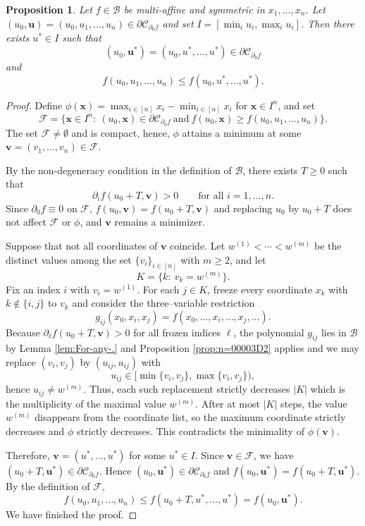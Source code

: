 \documentclass[10pt,a4paper]{amsart}
\providecommand{\propositionname}{Proposition}
\numberwithin{equation}{section}
\numberwithin{figure}{section}
\theoremstyle{plain}
\theoremstyle{remark}
\theoremstyle{definition}
\theoremstyle{plain}
\theoremstyle{definition}
\theoremstyle{plain}
\theoremstyle{plain}
\newtheorem{prop}[thm]{\protect\propositionname}
\theoremstyle{plain}
\newcommand{\pdv}{\partial}
\def\C{\mathcal C}
\def\x{\mathbf{x}}
\def\u{\mathbf{u}}
\def\v{\mathbf{v}}
\providecommand{\propositionname}{Proposition}
\providecommand{\propositionname}{Proposition}
\begin{document}
\begin{prop}
\label{prop:symmetry}Let $f\in\mathcal{B}$ be multi-affine and symmetric
in $x_{1},\dots,x_{n}$. Let $(u_{0},\u)=(u_{0},u_{1},\dots,u_{n})\in\partial\mathcal{C}_{\partial_{0}f}$
and set $I=[\min_{i}u_{i},\max_{i}u_{i}]$. Then there exists $u^{*}\in I$
such that 
\[
(u_{0},\u^{*})=(u_{0},u^{*},\dots,u^{*})\in\partial\mathcal{C}_{\partial_{0}f}
\]
and 
\[
f(u_{0},u_{1},\dots,u_{n})\le f(u_{0},u^{*},\dots,u^{*}).
\]
\end{prop}

\begin{proof}
Define $\phi(\x)=\max_{i\in[n]}x_{i}-\min_{i\in[n]}x_{i}$ for $\x\in I^{n}$,
and set 
\[
\mathcal{F}=\bigl\{\x\in I^{n}:\ (u_{0},\x)\in\partial\mathcal{C}_{\partial_{0}f}\ \text{and}\ f(u_{0},\x)\ge f(u_{0},u_{1},\dots,u_{n})\bigr\}.
\]
The set $\mathcal{F}\not=\emptyset$ and is compact, hence, $\phi$ attains
a minimum at some $\mathbf{v}=(v_{1},\dots,v_{n})\in\mathcal{F}$.

By the non-degeneracy condition in the definition of $\mathcal{B}$,
there exists $T\ge0$ such that 
\[
\partial_{i}f(u_{0}+T,\mathbf{v})>0\qquad\text{for all }i=1,\dots,n.
\]
Since $\partial_{0}f\equiv0$ on $\mathcal{F}$, $f(u_{0},\v)=f(u_{0}+T,\v)$
and replacing $u_{0}$ by $u_{0}+T$ does not affect $\mathcal{F}$
or $\phi$, and $\mathbf{v}$ remains a minimizer. 

Suppose that not all coordinates of $\v$ coincide. Let $w^{(1)}<\cdots<w^{(m)}$
be the distinct values among the set $\{v_{i}\}_{i\in[n]}$ with $m\ge2$,
and let 
\[
K=\{k:\ v_{k}=w^{(m)}\}.
\]
Fix an index $i$ with $v_{i}=w^{(1)}$. For each $j\in K$, freeze
every coordinate $x_{k}$ with $k\notin\{i,j\}$ to $v_{k}$ and consider
the three--variable restriction 
\[
g_{ij}(x_0,x_{i},x_{j})=f(x_0,\dots,x_{i},\dots,x_{j},\dots).
\]
Because $\partial_{\ell}f(u_{0}+T,\mathbf{v})>0$ for all frozen indices
$\ell$, the polynomial $g_{ij}$ lies in $\mathcal{B}$ by Lemma \ref{lem:For-any-.} and Proposition
\ref{prop:n=00003D2} applies and we may replace $(v_{i},v_{j})$
by $(u_{ij},u_{ij})$ with 
\[
u_{ij}\in[\min\{v_{i},v_{j}\},\max\{v_{i},v_{j}\}),
\]
hence $u_{ij}\neq w^{(m)}$. Thus, each such replacement strictly decreases
$|K|$ which is the multiplicity of the maximal value $w^{(m)}$.
After at most $|K|$ steps, the value $w^{(m)}$ disappears from the
coordinate list, so the maximum coordinate strictly decreases and
$\phi$ strictly decreases. This contradicts the minimality of $\phi(\mathbf{v})$.

Therefore, $\v=(u^{*},\dots,u^{*})$ for some $u^{*}\in I$. Since
$\v\in\mathcal{F}$, we have $(u_{0}+T,\u^{*})\in\partial\mathcal{C}_{\partial_{0}f}$.
Hence $(u_{0},\u^{*})\in\pdv\C_{\pdv_{0}f}$ and $f(u_{0},\u^{*})=f(u_{0}+T,\u^{*})$.
By the definition of $\mathcal{F}$, 
\[
f(u_{0},u_{1},\dots,u_{n})\le f(u_{0}+T,u^{*},\dots,u^{*})=f(u_{0},\u^{*}).
\]
We have finished the proof.
\end{proof}
\end{document}

